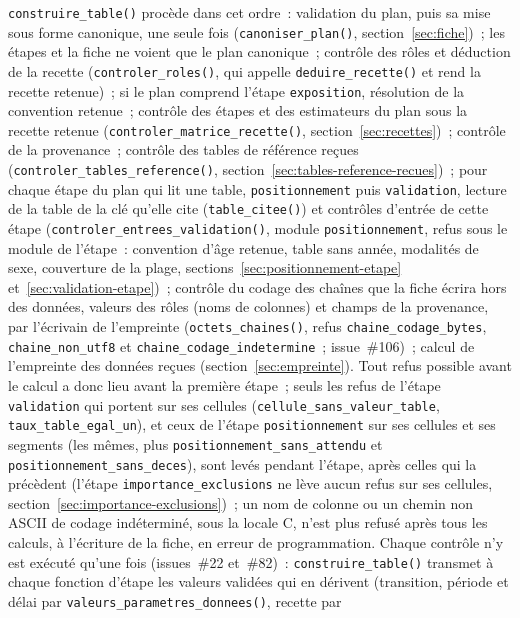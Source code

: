 \documentclass[a4paper,11pt]{article}
\newcommand{\code}[1]{\texttt{\small #1}}
\begin{document}
{\sloppy{} \code{construire\_table()} procède dans cet ordre~: validation du plan,
puis sa mise sous forme canonique, une seule fois (\code{canoniser\_plan()},
section~\ref{sec:fiche})~; les étapes et la fiche ne voient que le plan
canonique~; contrôle des rôles et déduction de la recette
(\code{controler\_roles()}, qui appelle \code{deduire\_recette()} et rend la
recette retenue)~; si le plan comprend l'étape \code{exposition}, résolution
de la convention retenue~; contrôle des étapes et des estimateurs du plan
sous la recette retenue (\code{controler\_matrice\_recette()},
section~\ref{sec:recettes})~; contrôle de la provenance~; contrôle des tables de référence reçues
(\code{controler\_tables\_reference()},
section~\ref{sec:tables-reference-recues})~; pour chaque étape du plan
qui lit une table, \code{positionnement} puis \code{validation}, lecture de
la table de la clé qu'elle cite (\code{table\_citee()}) et contrôles
d'entrée de cette étape (\code{controler\_entrees\_validation()}, module
\code{positionnement}, refus sous le module de l'étape~: convention d'âge
retenue, table sans année, modalités de sexe, couverture de la plage,
sections~\ref{sec:positionnement-etape} et~\ref{sec:validation-etape})~; contrôle du codage des chaînes que la fiche
écrira hors des données, valeurs des rôles (noms de colonnes) et champs de
la provenance, par l'écrivain de l'empreinte (\code{octets\_chaines()},
refus \code{chaine\_codage\_bytes}, \code{chaine\_non\_utf8} et
\code{chaine\_codage\_indetermine}~; issue~\#106)~; calcul de l'empreinte
des données reçues (section~\ref{sec:empreinte}). Tout refus possible avant
le calcul a donc lieu avant la première étape~; seuls les refus de l'étape
\code{validation} qui portent sur ses cellules
(\code{cellule\_sans\_valeur\_table}, \code{taux\_table\_egal\_un}),
et ceux de l'étape \code{positionnement} sur ses cellules et ses segments
(les mêmes, plus \code{positionnement\_sans\_attendu} et
\code{positionnement\_sans\_deces}), sont levés pendant l'étape, après
celles qui la précèdent (l'étape
\code{importance\_exclusions} ne lève aucun refus sur ses cellules,
section~\ref{sec:importance-exclusions})~; un nom de colonne ou un
chemin non ASCII de codage indéterminé, sous la locale C, n'est plus refusé
après tous les calculs, à l'écriture de la fiche, en erreur de
programmation. Chaque contrôle n'y est exécuté qu'une fois
(issues~\#22 et~\#82)~: \code{construire\_table()} transmet à chaque
fonction d'étape les valeurs validées qui en dérivent (transition, période
et délai par \code{valeurs\_parametres\_donnees()}, recette par
}
\end{document}
